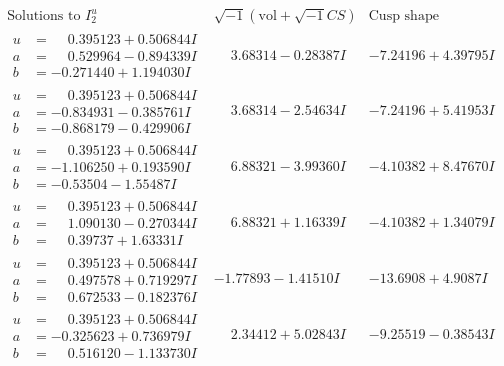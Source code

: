 \documentclass[1p]{elsarticle_modified}
\theoremstyle{definition}
\newcommand{\I}{\sqrt{-1}}
\begin{document}
$$\begin{array}{c|c|c}  
\text{Solutions to }I^u_{2}& \I (\text{vol} + \sqrt{-1}CS) & \text{Cusp shape}\\
 \hline 
\begin{aligned}
u &= \phantom{-}0.395123 + 0.506844 I \\
a &= \phantom{-}0.529964 - 0.894339 I \\
b &= -0.271440 + 1.194030 I\end{aligned}
 & \phantom{-}3.68314 - 0.28387 I & -7.24196 + 4.39795 I \\ \hline\begin{aligned}
u &= \phantom{-}0.395123 + 0.506844 I \\
a &= -0.834931 - 0.385761 I \\
b &= -0.868179 - 0.429906 I\end{aligned}
 & \phantom{-}3.68314 - 2.54634 I & -7.24196 + 5.41953 I \\ \hline\begin{aligned}
u &= \phantom{-}0.395123 + 0.506844 I \\
a &= -1.106250 + 0.193590 I \\
b &= -0.53504 - 1.55487 I\end{aligned}
 & \phantom{-}6.88321 - 3.99360 I & -4.10382 + 8.47670 I \\ \hline\begin{aligned}
u &= \phantom{-}0.395123 + 0.506844 I \\
a &= \phantom{-}1.090130 - 0.270344 I \\
b &= \phantom{-}0.39737 + 1.63331 I\end{aligned}
 & \phantom{-}6.88321 + 1.16339 I & -4.10382 + 1.34079 I \\ \hline\begin{aligned}
u &= \phantom{-}0.395123 + 0.506844 I \\
a &= \phantom{-}0.497578 + 0.719297 I \\
b &= \phantom{-}0.672533 - 0.182376 I\end{aligned}
 & -1.77893 - 1.41510 I & -13.6908 + 4.9087 I \\ \hline\begin{aligned}
u &= \phantom{-}0.395123 + 0.506844 I \\
a &= -0.325623 + 0.736979 I \\
b &= \phantom{-}0.516120 - 1.133730 I\end{aligned}
 & \phantom{-}2.34412 + 5.02843 I & -9.25519 - 0.38543 I \\ \hline\begin{aligned}

\end{aligned}
\end{array}$$
\end{document}

